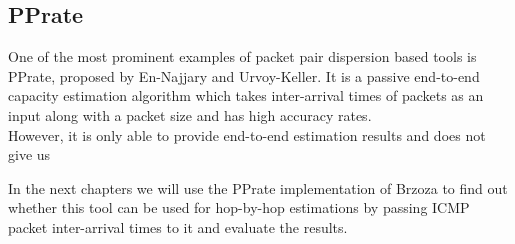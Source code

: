 \subsection{PPrate}
One of the most prominent examples of packet pair dispersion based tools is PPrate, proposed by En-Najjary and Urvoy-Keller\cite{pprate2006}. It is a passive end-to-end capacity estimation algorithm which takes inter-arrival times of packets as an input along with a packet size and has high accuracy rates.\\
However, it is only able to provide end-to-end estimation results and does not give us 

In the next chapters we will use the PPrate implementation of Brzoza\cite{Brzoza} to find out whether this tool can be used for hop-by-hop estimations by passing ICMP packet inter-arrival times to it and evaluate the results.

